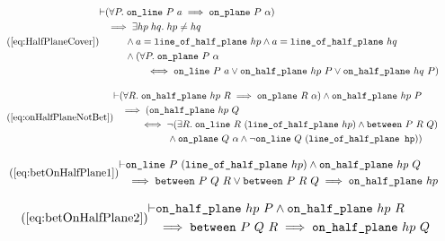 \begin{equation}\tag{\ref{eq:HalfPlaneCover}}
  \begin{split}
    \vdash&(\forall P.\; \code{on\_line}\ P\ a \implies \code{on\_plane}\ P\ \alpha)\\
    &\implies \exists hp\; hq.\; hp \neq hq\\
    &\qquad \wedge a = \code{line\_of\_half\_plane}\ hp \wedge a = \code{line\_of\_half\_plane}\ hq\\
    &\qquad \wedge (\forall P.\; \code{on\_plane}\ P\ \alpha\\
    &\qquad\qquad \iff \code{on\_line}\ P\ a \vee \code{on\_half\_plane}\ hp\ P \vee \code{on\_half\_plane}\ hq\ P)
  \end{split}
\end{equation}

\begin{equation}\tag{\ref{eq:onHalfPlaneNotBet}}
  \begin{split}
    \vdash&(\forall R.\; \code{on\_half\_plane}\ hp\ R \implies \code{on\_plane}\ R\ \alpha) \wedge \code{on\_half\_plane}\ hp\ P\\
    &\implies (\code{on\_half\_plane}\ hp\ Q\\
    &\qquad \iff \neg(\exists R.\; \code{on\_line}\ R\ (\code{line\_of\_half\_plane}\ hp) \wedge \between{P}{R}{Q})\\
    &\qquad\qquad\quad \wedge \code{on\_plane}\ Q\ \alpha \wedge \neg\code{on\_line}\ Q\ (\code{line\_of\_half\_plane hp}))
  \end{split}
\end{equation}

\begin{equation}\tag{\ref{eq:betOnHalfPlane1}}
  \begin{split}
    \vdash&\code{on\_line}\ P\ (\code{line\_of\_half\_plane}\ hp) \wedge \code{on\_half\_plane}\ hp\ Q\\
    &\implies \between{P}{Q}{R} \vee \between{P}{R}{Q} \implies \code{on\_half\_plane}\ hp
  \end{split}
\end{equation}

\begin{equation}\tag{\ref{eq:betOnHalfPlane2}}
  \begin{split}
    \vdash&\code{on\_half\_plane}\ hp\ P \wedge \code{on\_half\_plane}\ hp\ R\\
    &\implies \between{P}{Q}{R} \implies \code{on\_half\_plane}\ hp\ Q
  \end{split}
\end{equation}

